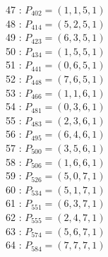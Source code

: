 \documentclass{article}
\begin{document}
{\begin{multicols}{2}
47 : $P_{402}=( 1, 1, 5, 1 )$\\
48 : $P_{414}=( 5, 2, 5, 1 )$\\
49 : $P_{423}=( 6, 3, 5, 1 )$\\
50 : $P_{434}=( 1, 5, 5, 1 )$\\
51 : $P_{441}=( 0, 6, 5, 1 )$\\
52 : $P_{448}=( 7, 6, 5, 1 )$\\
53 : $P_{466}=( 1, 1, 6, 1 )$\\
54 : $P_{481}=( 0, 3, 6, 1 )$\\
55 : $P_{483}=( 2, 3, 6, 1 )$\\
56 : $P_{495}=( 6, 4, 6, 1 )$\\
57 : $P_{500}=( 3, 5, 6, 1 )$\\
58 : $P_{506}=( 1, 6, 6, 1 )$\\
59 : $P_{526}=( 5, 0, 7, 1 )$\\
60 : $P_{534}=( 5, 1, 7, 1 )$\\
61 : $P_{551}=( 6, 3, 7, 1 )$\\
62 : $P_{555}=( 2, 4, 7, 1 )$\\
63 : $P_{574}=( 5, 6, 7, 1 )$\\
64 : $P_{584}=( 7, 7, 7, 1 )$\\
\end{multicols}
}
\end{document}
